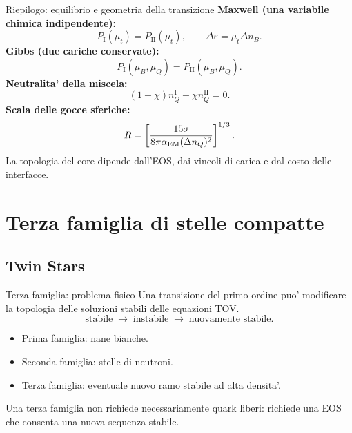 \begin{frame}{Riepilogo: equilibrio e geometria della transizione}
\footnotesize
\textbf{Maxwell (una variabile chimica indipendente):}
\[
P_{\mathrm I}(\mu_t)=P_{\mathrm{II}}(\mu_t),
\qquad \Delta\varepsilon=\mu_t\Delta n_B.
\]
\textbf{Gibbs (due cariche conservate):}
\[
P_{\mathrm I}(\mu_B,\mu_Q)
=P_{\mathrm{II}}(\mu_B,\mu_Q).
\]
\textbf{Neutralita' della miscela:}
\[
(1-\chi)n_Q^{\mathrm I}+\chi n_Q^{\mathrm{II}}=0.
\]
\textbf{Scala delle gocce sferiche:}
\[
R=\left[\frac{15\sigma}
{8\pi\alpha_{\rm EM}(\Delta n_Q)^2}\right]^{1/3}.
\]
La topologia del core dipende dall'EOS, dai vincoli di carica
e dal costo delle interfacce.
\end{frame}

\section{Terza famiglia di stelle compatte}

\subsection{Twin Stars}

\begin{frame}{Terza famiglia: problema fisico}
\small
Una transizione del primo ordine puo' modificare la topologia
 delle soluzioni stabili delle equazioni TOV.
\[
\text{stabile}\;\longrightarrow\;\text{instabile}
\;\longrightarrow\;\text{nuovamente stabile}.
\]
\begin{itemize}
\item Prima famiglia: nane bianche.
\item Seconda famiglia: stelle di neutroni.
\item Terza famiglia: eventuale nuovo ramo stabile ad alta densita'.
\end{itemize}
Una terza famiglia non richiede necessariamente quark liberi:
richiede una EOS che consenta una nuova sequenza stabile.
\end{frame}

